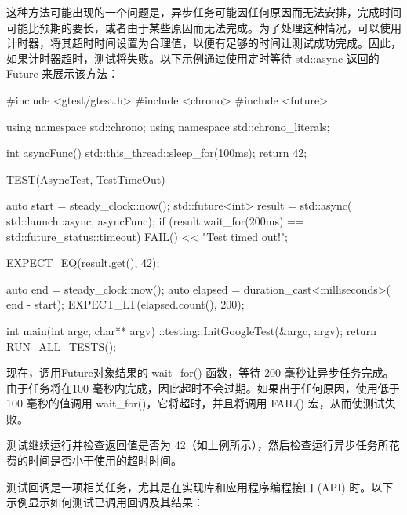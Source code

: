 
这种方法可能出现的一个问题是，异步任务可能因任何原因而无法安排，完成时间可能比预期的要长，或者由于某些原因而无法完成。为了处理这种情况，可以使用计时器，将其超时时间设置为合理值，以便有足够的时间让测试成功完成。因此，如果计时器超时，测试将失败。以下示例通过使用定时等待 std::async 返回的 Future 来展示该方法：

\begin{cpp}
#include <gtest/gtest.h>
#include <chrono>
#include <future>

using namespace std::chrono;
using namespace std::chrono_literals;

int asyncFunc() {
    std::this_thread::sleep_for(100ms);
    return 42;
}

TEST(AsyncTest, TestTimeOut) {
    auto start = steady_clock::now();
    std::future<int> result = std::async(
                            std::launch::async,
                            asyncFunc);
    if (result.wait_for(200ms) ==
                std::future_status::timeout) {
        FAIL() << "Test timed out!";
    }

    EXPECT_EQ(result.get(), 42);

    auto end = steady_clock::now();
    auto elapsed = duration_cast<milliseconds>(
                                end - start);
    EXPECT_LT(elapsed.count(), 200);
}

int main(int argc, char** argv) {
    ::testing::InitGoogleTest(&argc, argv);
    return RUN_ALL_TESTS();
}
\end{cpp}

现在，调用Future对象结果的 wait\_for() 函数，等待 200 毫秒让异步任务完成。由于任务将在100 毫秒内完成，因此超时不会过期。如果出于任何原因，使用低于 100 毫秒的值调用 wait\_for()，它将超时，并且将调用 FAIL() 宏，从而使测试失败。

测试继续运行并检查返回值是否为 42（如上例所示），然后检查运行异步任务所花费的时间是否小于使用的超时时间。


测试回调是一项相关任务，尤其是在实现库和应用程序编程接口 (API) 时。以下示例显示如何测试已调用回调及其结果：

